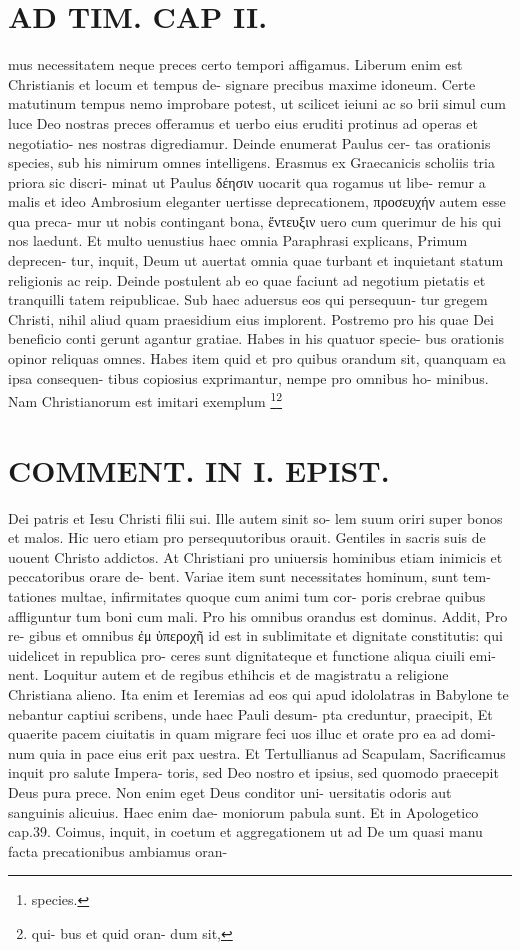 \documentclass{article}
\begin{document}
\begin{pages}
\section*{AD TIM. CAP II. }
\marginpar{[ p.111 ]}\pstart mus necessitatem neque preces certo tempori affigamus. Liberum enim est Christianis et locum et tempus de- signare precibus maxime idoneum. Certe matutinum tempus nemo improbare potest, ut scilicet ieiuni ac so brii simul cum luce Deo nostras preces offeramus et uerbo eius eruditi protinus ad operas et negotiatio- nes nostras digrediamur. Deinde enumerat Paulus cer- tas orationis species, sub his nimirum omnes intelligens. Erasmus ex Graecanicis scholiis tria priora sic discri- minat ut Paulus δέησιν uocarit qua rogamus ut libe- remur a malis et ideo Ambrosium eleganter uertisse deprecationem, προσευχήν autem esse qua preca- mur ut nobis contingant bona, ἔντευξιν uero cum querimur de his qui nos laedunt. Et multo uenustius haec omnia Paraphrasi explicans, Primum deprecen- tur, inquit, Deum ut auertat omnia quae turbant et inquietant statum religionis ac reip. Deinde postulent ab eo quae faciunt ad negotium pietatis et tranquilli tatem reipublicae. Sub haec aduersus eos qui persequun- tur gregem Christi, nihil aliud quam praesidium eius implorent. Postremo pro his quae Dei beneficio conti gerunt agantur gratiae. Habes in his quatuor specie- bus orationis opinor reliquas omnes. Habes item quid et pro quibus orandum sit, quanquam ea ipsa consequen- tibus copiosius exprimantur, nempe pro omnibus ho- minibus. Nam Christianorum est imitari exemplum  \pend\footnote{\footnotesizeOrationie species. }\footnote{\footnotesizePro qui- bus et quid oran- dum sit, }
\section*{COMMENT. IN I. EPIST. }\pstart Dei patris et Iesu Christi filii sui. Ille autem sinit so- lem suum oriri super bonos et malos. Hic uero etiam pro persequutoribus orauit. Gentiles in sacris suis de uouent Christo addictos. At Christiani pro uniuersis hominibus etiam inimicis et peccatoribus orare de- bent. Variae item sunt necessitates hominum, sunt tem- tationes multae, infirmitates quoque cum animi tum cor- poris crebrae quibus affliguntur tum boni cum mali. Pro his omnibus orandus est dominus. Addit, Pro re- gibus et omnibus ἐμ ὑπεροχῆ id est in sublimitate et dignitate constitutis: qui uidelicet in republica pro- ceres sunt dignitateque et functione aliqua ciuili emi- nent. Loquitur autem et de regibus ethihcis et de magistratu a religione Christiana alieno. Ita enim et Ieremias ad eos qui apud idololatras in Babylone te nebantur captiui scribens, unde haec Pauli desum- pta creduntur, praecipit, Et quaerite pacem ciuitatis in quam migrare feci uos illuc et orate pro ea ad domi- num quia in pace eius erit pax uestra. Et Tertullianus ad Scapulam, Sacrificamus inquit pro salute Impera- toris, sed Deo nostro et ipsius, sed quomodo praecepit Deus pura prece. Non enim eget Deus conditor uni- uersitatis odoris aut sanguinis alicuius. Haec enim dae- moniorum pabula sunt. Et in Apologetico cap.39. Coimus, inquit, in coetum et aggregationem ut ad De um quasi manu facta precationibus ambiamus oran-  \pend

\end{pages}
\end{document}
